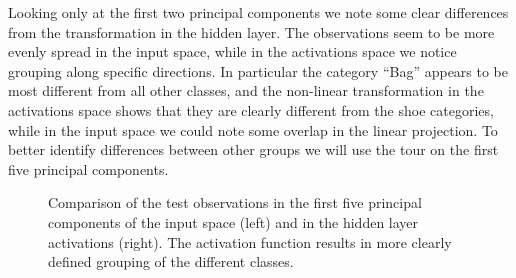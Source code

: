 \documentclass[
  letterpaper,
]{krantz}
\begin{document}
Looking only at the first two principal components we note some clear
differences from the transformation in the hidden layer. The
observations seem to be more evenly spread in the input space, while in
the activations space we notice grouping along specific directions. In
particular the category ``Bag'' appears to be most different from all
other classes, and the non-linear transformation in the activations
space shows that they are clearly different from the shoe categories,
while in the input space we could note some overlap in the linear
projection. To better identify differences between other groups we will
use the tour on the first five principal components.

\begin{figure}

\begin{minipage}{0.50\linewidth}



\end{minipage}%
%
\begin{minipage}{0.50\linewidth}



\end{minipage}%

\caption{\label{fig-p-split-pdf}Comparison of the test observations in
the first five principal components of the input space (left) and in the
hidden layer activations (right). The activation function results in
more clearly defined grouping of the different classes.}

\end{figure}%
\end{document}
